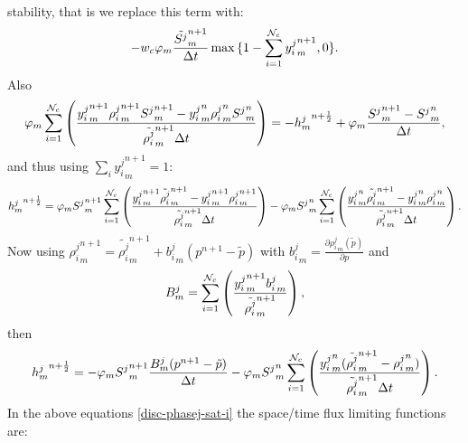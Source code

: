 stability, that is we replace this term with:
\begin{eqnarray}
-w_c \phi_m\frac{\tilde{ S^j}_m^{n+1}}{\Delta t}  \max{ \{
1- \sum_{i=1}^{{\cal N}_c} { y_{i}^{j}}_m^{n+1} , 0\} }  .
\end{eqnarray}
Also
\begin{eqnarray}
\phi_m \sum_{i=1}^{{\cal N}_c} \left(
\frac{ {y_{i}^{j}}_m^{n+1} {\rho_{i}^{j}}_m^{n+1} { S^j}_m^{n+1}
- {y_{i}^{j}}_m^{n} {\rho_{i}^{j}}_m^{n} { S^j}_m^{n}
}
{\tilde{\rho_{i}^{j}}_m^{n+1} \Delta t}
\right)
= -{h^j_m}^{n+\frac{1}{2}} + \phi_m \frac{{ S^j}_m^{n+1}-{ S^j}_m^{n}}{\Delta t} ,
\end{eqnarray}
and thus using $\sum_i {y_{i}^{j}}_m^{n+1}=1$:
\begin{eqnarray}
{h^j_m}^{n+\frac{1}{2}} =
\phi_m { S^j}_m^{n+1} \sum_{i=1}^{{\cal N}_c} \left(
\frac{ {y_{i}^{j}}_m^{n+1} \tilde{\rho_{i}^{j}}_m^{n+1}
- {y_{i}^{j}}_m^{n+1} {\rho_{i}^{j}}_m^{n+1}
}
{\tilde{\rho_{i}^{j}}_m^{n+1} \Delta t}
\right)
-
\phi_m { S^j}_m^{n} \sum_{i=1}^{{\cal N}_c} \left(
\frac{ {y_{i}^{j}}_m^{n} \tilde{\rho_{i}^{j}}_m^{n+1}
- {y_{i}^{j}}_m^{n} {\rho_{i}^{j}}_m^{n}
}
{\tilde{\rho_{i}^{j}}_m^{n+1} \Delta t}
\right).
\end{eqnarray}
Now using ${\rho_{i}^{j}}_m^{n+1}=\tilde{\rho_{i}^{j}}_m^{n+1} + {b_i^j}_m (p^{n+1}-\tilde{p})$
with ${b_i^j}_m =\frac{\partial{\rho_{i}^{j}}_m (\tilde{p}) }{\partial p} $ and
\begin{eqnarray}
B^j_m=\sum_{i=1}^{{\cal N}_c} \left(
\frac{
{y_{i}^{j}}_m^{n+1} {b_i^j}_m   }
{\tilde{\rho_{i}^{j}}_m^{n+1}}
\right),
\end{eqnarray}
then
\begin{eqnarray}
{h^j_m}^{n+\frac{1}{2}} =
-\phi_m { S^j}_m^{n+1} \frac{ B^j_m (p^{n+1}-\tilde{p})}{\Delta t}
-
\phi_m { S^j}_m^{n} \sum_{i=1}^{{\cal N}_c} \left(
\frac{ {y_{i}^{j}}_m^{n} (\tilde{\rho_{i}^{j}}_m^{n+1}
-  {\rho_{i}^{j}}_m^{n} )
}
{\tilde{\rho_{i}^{j}}_m^{n+1} \Delta t}
\right).
\end{eqnarray}
In the above equations \ref{disc-phasej-sat-i} the space/time flux limiting functions are:





